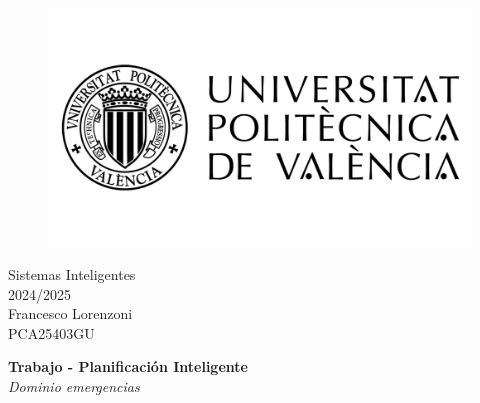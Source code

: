 \begin{titlepage}
   \begin{figure}
      \vspace{50mm}
       \centering
       \includegraphics[keepaspectratio=true,width=0.40\columnwidth]{images/upvLogo.png}
   \end{figure}
   
   \vspace{40mm}
   \begin{center}
       \LARGE{Sistemas Inteligentes}
       \vspace{2.5mm}
       \\ \large{2024/2025}
       \vspace{5mm}
    \\ \large{Francesco Lorenzoni\\\textsc{PCA25403GU}}

   \end{center}
   
   \begin{center}
      \vspace{10mm}
       {\LARGE{\textbf{Trabajo - Planificación Inteligente}\\ \vspace{5mm}
       \textit{Dominio emergencias}}}
       
   \end{center}
\end{titlepage}